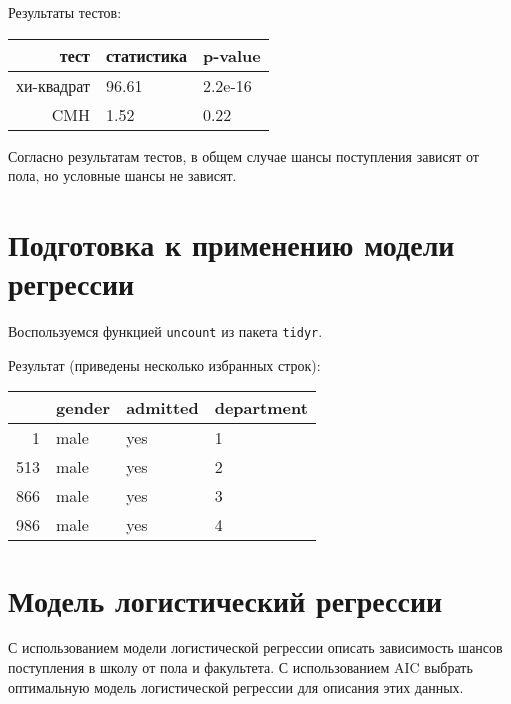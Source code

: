 \documentclass[a4paper,12pt]{article}
\begin{document}
Результаты тестов:

\begin{table}[H]
    \centering
    \begin{tabular}{rll}
        \hline
        тест & статистика & p-value \\
        \hline
        хи-квадрат & 96.61 & 2.2e-16 \\
        CMH & 1.52 & 0.22 \\
        \hline
    \end{tabular}
\end{table}

Согласно результатам тестов, в общем случае шансы поступления зависят от пола, но условные шансы не зависят.

\section{Подготовка к применению модели регрессии}

Воспользуемся функцией \texttt{uncount} из пакета \texttt{tidyr}.

Результат (приведены несколько избранных строк):

\begin{table}[H]
    \centering
    \begin{tabular}{rlll}
        \hline
        & gender & admitted & department \\
        \hline
        1 & male & yes & 1 \\
        513 & male & yes & 2 \\
        866 & male & yes & 3 \\
        986 & male & yes & 4 \\
        \hline
    \end{tabular}
\end{table}


\section{Модель логистический регрессии}

\begin{leftbar}
    С использованием модели логистической регрессии описать зависимость шансов поступления в школу от пола и факультета.
    С использованием AIC выбрать оптимальную модель логистической регрессии для описания этих данных.
\end{leftbar}
\end{document}
